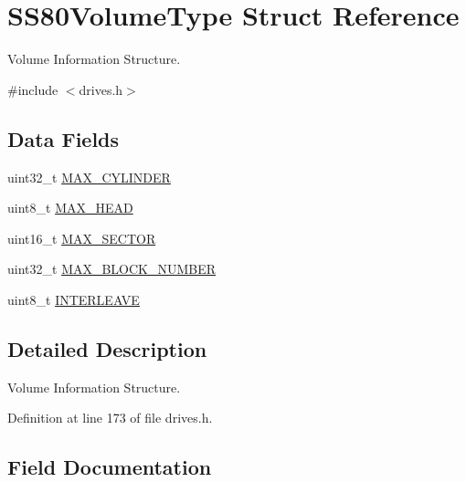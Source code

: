 \hypertarget{structSS80VolumeType}{}\section{S\+S80\+Volume\+Type Struct Reference}
\label{structSS80VolumeType}


Volume Information Structure.  




{\ttfamily \#include $<$drives.\+h$>$}

\subsection*{Data Fields}
\begin{DoxyCompactItemize}
\item 
uint32\+\_\+t \hyperlink{structSS80VolumeType_a53b65739246cea4e0d9095c88b03be8e}{M\+A\+X\+\_\+\+C\+Y\+L\+I\+N\+D\+ER}
\item 
uint8\+\_\+t \hyperlink{structSS80VolumeType_acc2870eb0a52a0e7f4dc57f036d903b1}{M\+A\+X\+\_\+\+H\+E\+AD}
\item 
uint16\+\_\+t \hyperlink{structSS80VolumeType_a0a367b3bf05801cdee9dadc8324a3bdb}{M\+A\+X\+\_\+\+S\+E\+C\+T\+OR}
\item 
uint32\+\_\+t \hyperlink{structSS80VolumeType_afe3db69c9ec54fa6d9fd48f3e6e9097b}{M\+A\+X\+\_\+\+B\+L\+O\+C\+K\+\_\+\+N\+U\+M\+B\+ER}
\item 
uint8\+\_\+t \hyperlink{structSS80VolumeType_accc9f011ff8edebcc6d781d1aa51f16d}{I\+N\+T\+E\+R\+L\+E\+A\+VE}
\end{DoxyCompactItemize}


\subsection{Detailed Description}
Volume Information Structure. 

Definition at line 173 of file drives.\+h.



\subsection{Field Documentation}
\mbox{\label{structSS80VolumeType_accc9f011ff8edebcc6d781d1aa51f16d}} 

